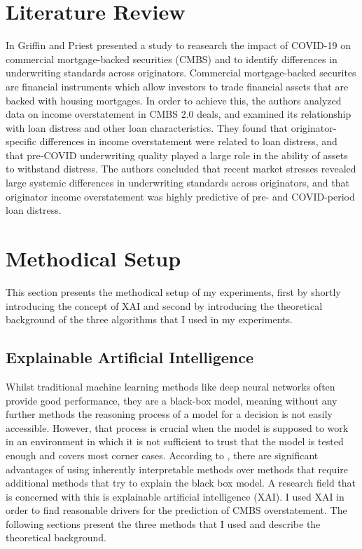 \documentclass{article}
\begin{document}
\section{Literature Review}
In \cite{CMBS-Paper} Griffin and Priest presented a study to reasearch the impact of COVID-19 on commercial mortgage-backed securities (CMBS) and to identify differences in underwriting standards across originators.
Commercial mortgage-backed securites are financial instruments which allow investors to trade financial assets that are backed with housing mortgages. 
In order to achieve this, the authors analyzed data on income overstatement in CMBS 2.0 deals, and examined its relationship with loan distress and other loan characteristics.
They found that originator-specific differences in income overstatement were related to loan distress, and that pre-COVID underwriting quality played a large role in the ability of assets to withstand distress. The authors concluded that recent market stresses revealed large systemic differences in underwriting standards across originators, and that originator income overstatement was highly predictive of pre- and COVID-period loan distress.

\section{Methodical Setup}
This section presents the methodical setup of my experiments, first by shortly introducing the concept of XAI and second by introducing the theoretical background of the three algorithms that I used in my experiments.
\subsection{Explainable Artificial Intelligence}
Whilst traditional machine learning methods like deep neural networks often provide good performance, they are a black-box model, meaning without any further methods the reasoning process of a model for a decision is not easily accessible.
However, that process is crucial when the model is supposed to work in an environment in which it is not sufficient to trust that the model is tested enough and covers most corner cases.
According to \cite{Rudin2019}, there are significant advantages of using inherently interpretable methods over methods that require additional methods that try to explain the black box model.
A research field that is concerned with this is explainable artificial intelligence (XAI).
I used XAI in order to find reasonable drivers for the prediction of CMBS overstatement.
The following sections present the three methods that I used and describe the theoretical background.
\end{document}
